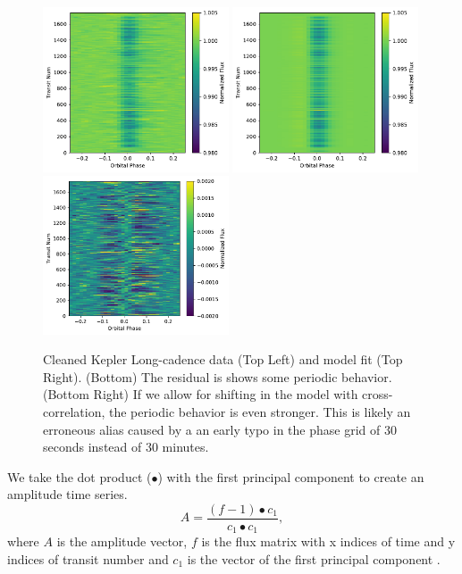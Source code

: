 \documentclass[preprint]{aastex61}
\begin{document}
\begin{figure}[!hbtp]
\begin{centering}
\includegraphics[width=0.49\textwidth]{images/kepler/photometry_riverplot.pdf}
\includegraphics[width=0.49\textwidth]{images/kepler/model_riverplot.pdf}
\includegraphics[width=0.49\textwidth]{images/kepler/residual_riverplot.pdf}
\caption{Cleaned Kepler Long-cadence data (Top Left) and model fit (Top Right).
(Bottom) The residual is shows some periodic behavior.
(Bottom Right) If we allow for shifting in the model with cross-correlation, the periodic behavior is even stronger.
This is likely an erroneous alias caused by a an early typo in the phase grid of 30 seconds instead of 30 minutes.}\label{fig:riverPlots}
\end{centering}
\end{figure}

We take the dot product ($\bullet$) with the first principal component to create an amplitude time series.
\begin{equation}
A = \frac{(f - 1) \bullet c_1}{c_1 \bullet c_1},
\end{equation}
where $A$ is the amplitude vector, $f$ is the flux matrix with x indices of time and y indices of transit number and $c_1$ is the vector of the first principal component .
\end{document}
